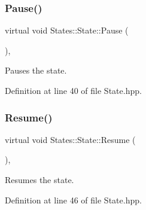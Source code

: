 \mbox{\label{class_states_1_1_state_aa6e8c4d6cba7b9a01f041e135babe2c4}} 
\subsubsection{\texorpdfstring{Pause()}{Pause()}}
{\footnotesize\ttfamily virtual void States\+::\+State\+::\+Pause (\begin{DoxyParamCaption}{ }\end{DoxyParamCaption})\hspace{0.3cm}{\ttfamily [inline]}, {\ttfamily [virtual]}}



Pauses the state. 

\begin{DoxyVerb}\end{DoxyVerb}
 

Definition at line 40 of file State.\+hpp.


\begin{DoxyCode}{0}

\end{DoxyCode}
\mbox{\label{class_states_1_1_state_a6051e49b660cf6e35baf28b25892a91b}} 
\subsubsection{\texorpdfstring{Resume()}{Resume()}}
{\footnotesize\ttfamily virtual void States\+::\+State\+::\+Resume (\begin{DoxyParamCaption}{ }\end{DoxyParamCaption})\hspace{0.3cm}{\ttfamily [inline]}, {\ttfamily [virtual]}}



Resumes the state. 

\begin{DoxyVerb}\end{DoxyVerb}
 

Definition at line 46 of file State.\+hpp.


\begin{DoxyCode}{0}

\end{DoxyCode}
\mbox{\label{class_states_1_1_state_ab8e935def8138e0b917c3228a29904e4}} 

